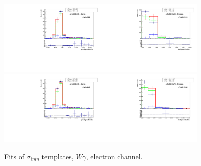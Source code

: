 \begin{figure}[htb]
\begin{center}
   \includegraphics[width=0.45\textwidth]{../figs/figs_v11/ELECTRON_WGamma/TemplateFits/c_TEMPL_SIHIH_UNblind__phoEt55to65__Barrel__RooFit.pdf}\includegraphics[width=0.45\textwidth]{../figs/figs_v11/ELECTRON_WGamma/TemplateFits/c_TEMPL_SIHIH_UNblind__phoEt55to65__Endcap__RooFit.pdf}\\
   \includegraphics[width=0.45\textwidth]{../figs/figs_v11/ELECTRON_WGamma/TemplateFits/c_TEMPL_SIHIH_UNblind__phoEt65to75__Barrel__RooFit.pdf}\includegraphics[width=0.45\textwidth]{../figs/figs_v11/ELECTRON_WGamma/TemplateFits/c_TEMPL_SIHIH_UNblind__phoEt65to75__Endcap__RooFit.pdf}\\
  \label{fig:templateFits_SIHIH_ELECTRON_2}
  \caption{Fits of $\sigma_{i \eta i \eta}$ templates, $W\gamma$, electron channel.}
  \end{center}
\end{figure}

